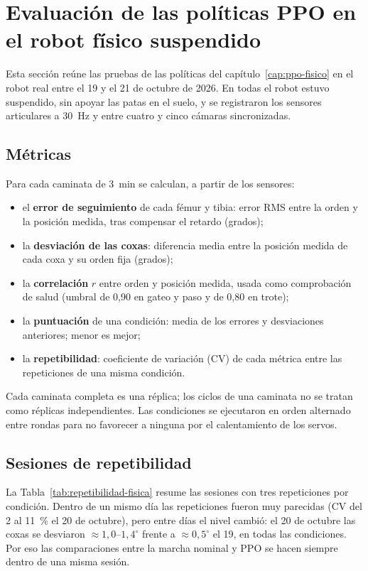 \section{Evaluación de las políticas PPO en el robot físico suspendido}
\label{sec:resultados-robot-fisico}

Esta sección reúne las pruebas de las políticas del
capítulo~\ref{cap:ppo-fisico} en el robot real entre el 19 y el 21 de octubre de
2026. En todas el robot estuvo suspendido, sin apoyar las patas en el suelo, y
se registraron los sensores articulares a 30~Hz y entre cuatro y cinco cámaras
sincronizadas.

\subsection{Métricas}

Para cada caminata de 3~min se calculan, a partir de los sensores:
\begin{itemize}
    \item el \textbf{error de seguimiento} de cada fémur y tibia: error RMS entre
    la orden y la posición medida, tras compensar el retardo (grados);
    \item la \textbf{desviación de las coxas}: diferencia media entre la posición
    medida de cada coxa y su orden fija (grados);
    \item la \textbf{correlación} $r$ entre orden y posición medida, usada como
    comprobación de salud (umbral de 0,90 en gateo y paso y de 0,80 en trote);
    \item la \textbf{puntuación} de una condición: media de los errores y
    desviaciones anteriores; menor es mejor;
    \item la \textbf{repetibilidad}: coeficiente de variación (CV) de cada
    métrica entre las repeticiones de una misma condición.
\end{itemize}
Cada caminata completa es una réplica; los ciclos de una caminata no se tratan
como réplicas independientes. Las condiciones se ejecutaron en orden alternado
entre rondas para no favorecer a ninguna por el calentamiento de los servos.

\subsection{Sesiones de repetibilidad}

La Tabla~\ref{tab:repetibilidad-fisica} resume las sesiones con tres
repeticiones por condición. Dentro de un mismo día las repeticiones fueron muy
parecidas (CV del 2 al 11~\% el 20 de octubre), pero entre días el nivel
cambió: el 20 de octubre las coxas se desviaron $\approx1{,}0$--$1{,}4^\circ$
frente a $\approx0{,}5^\circ$ el 19, en todas las condiciones. Por eso las
comparaciones entre la marcha nominal y PPO se hacen siempre dentro de una
misma sesión.

